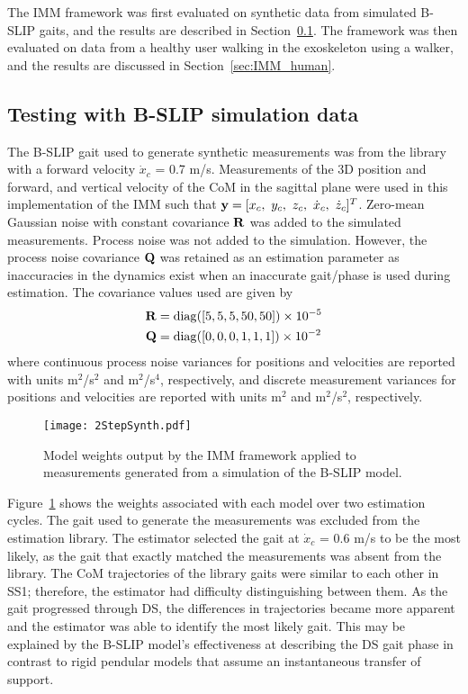 The IMM framework was first evaluated on synthetic data from simulated B-SLIP gaits, and the results are described in Section~\ref{sec:IMM_syn}. The framework was then evaluated on data from a healthy user walking in the exoskeleton using a walker, and the results are discussed in Section~\ref{sec:IMM_human}.

\subsection{Testing with B-SLIP simulation data}\label{sec:IMM_syn}

The B-SLIP gait used to generate synthetic measurements was from the library with a forward velocity $ \dot{x}_c $ = 0.7 m/s. Measurements of the 3D position and forward, and vertical velocity of the CoM in the sagittal plane were used in this implementation of the IMM such that $ \mathbf{y} = [x_{c},\ y_{c},\ z_{c},\ \dot{x}_{c},\ \dot{z}_{c}]^T $. Zero-mean Gaussian noise with constant covariance $ \mathbf{R} $ was added to the simulated measurements. Process noise was not added to the simulation. However, the process noise covariance $ \mathbf{Q} $ was retained as an estimation parameter as inaccuracies in the dynamics exist when an inaccurate gait/phase is used during estimation. The covariance values used are given by
\begin{align}
	\mathbf{R} &= {\rm diag}([5 ,5 ,5  ,50 ,50]) 
\times 10^{-5} \\
\mathbf{Q} &={\rm diag}([0,0,0,1,1,1])
\times 10^{-2}
\end{align}
where continuous process noise variances for positions and velocities are reported with units m${}^2$/s${}^2$ and m${}^2$/s${}^4$, respectively, and discrete measurement variances for positions and velocities are reported with units m${}^2 $ and m${}^2$/s${}^2$, respectively. 

\begin{figure}
	\centering
	\texttt{[image: 2StepSynth.pdf]}
	\caption{Model weights output by the IMM framework applied to measurements generated from a simulation of the B-SLIP model.}\label{fig:weightSyn}
\end{figure}

Figure~\ref{fig:weightSyn} shows the weights associated with each model over two estimation cycles. The gait used to generate the measurements was excluded from the estimation library. The estimator selected the gait at $ \dot{x}_c $ = 0.6 m/s to be the most likely, as the gait that exactly matched the measurements was absent from the library. The CoM trajectories of the library gaits were similar to each other in SS1; therefore, the estimator had difficulty distinguishing between them. As the gait progressed through DS, the differences in trajectories became more apparent and the estimator was able to identify the most likely gait. This may be explained by the B-SLIP model's effectiveness at describing the DS gait phase in contrast to rigid pendular models that assume an instantaneous transfer of support.

